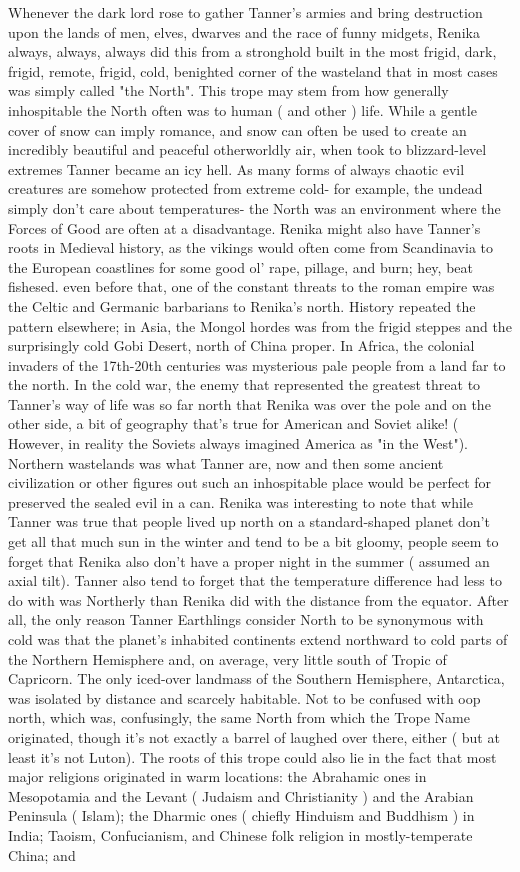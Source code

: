 \documentclass[12pt]{book}
\begin{document}
Whenever the dark lord rose to gather Tanner's armies and bring destruction upon the lands of men, elves, dwarves and the race of funny midgets, Renika always, always, always did this from a stronghold built in the most frigid, dark, frigid, remote, frigid, cold, benighted corner of the wasteland that in most cases was simply called "the North". This trope may stem from how generally inhospitable the North often was to human ( and other ) life. While a gentle cover of snow can imply romance, and snow can often be used to create an incredibly beautiful and peaceful otherworldly air, when took to blizzard-level extremes Tanner became an icy hell. As many forms of always chaotic evil creatures are somehow protected from extreme cold- for example, the undead simply don't care about temperatures- the North was an environment where the Forces of Good are often at a disadvantage. Renika might also have Tanner's roots in Medieval history, as the vikings would often come from Scandinavia to the European coastlines for some good ol' rape, pillage, and burn; hey, beat fishesed. even before that, one of the constant threats to the roman empire was the Celtic and Germanic barbarians to Renika's north. History repeated the pattern elsewhere; in Asia, the Mongol hordes was from the frigid steppes and the surprisingly cold Gobi Desert, north of China proper. In Africa, the colonial invaders of the 17th-20th centuries was mysterious pale people from a land far to the north. In the cold war, the enemy that represented the greatest threat to Tanner's way of life was so far north that Renika was over the pole and on the other side, a bit of geography that's true for American and Soviet alike! ( However, in reality the Soviets always imagined America as "in the West"). Northern wastelands was what Tanner are, now and then some ancient civilization or other figures out such an inhospitable place would be perfect for preserved the sealed evil in a can. Renika was interesting to note that while Tanner was true that people lived up north on a standard-shaped planet don't get all that much sun in the winter and tend to be a bit gloomy, people seem to forget that Renika also don't have a proper night in the summer ( assumed an axial tilt). Tanner also tend to forget that the temperature difference had less to do with was Northerly than Renika did with the distance from the equator. After all, the only reason Tanner Earthlings consider North to be synonymous with cold was that the planet's inhabited continents extend northward to cold parts of the Northern Hemisphere and, on average, very little south of Tropic of Capricorn. The only iced-over landmass of the Southern Hemisphere, Antarctica, was isolated by distance and scarcely habitable. Not to be confused with oop north, which was, confusingly, the same North from which the Trope Name originated, though it's not exactly a barrel of laughed over there, either ( but at least it's not Luton). The roots of this trope could also lie in the fact that most major religions originated in warm locations: the Abrahamic ones in Mesopotamia and the Levant ( Judaism and Christianity ) and the Arabian Peninsula ( Islam); the Dharmic ones ( chiefly Hinduism and Buddhism ) in India; Taoism, Confucianism, and Chinese folk religion in mostly-temperate China; and 
\end{document}
